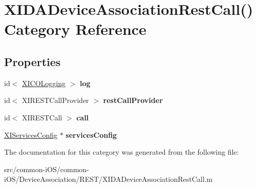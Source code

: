 \hypertarget{category_x_i_d_a_device_association_rest_call_07_08}{}\section{X\+I\+D\+A\+Device\+Association\+Rest\+Call() Category Reference}
\label{category_x_i_d_a_device_association_rest_call_07_08}
\subsection*{Properties}
\begin{DoxyCompactItemize}
\item 
\hypertarget{category_x_i_d_a_device_association_rest_call_07_08_ac4e9df19181651fd226fd84c9334ba4f}{}\label{category_x_i_d_a_device_association_rest_call_07_08_ac4e9df19181651fd226fd84c9334ba4f} 
id$<$ \hyperlink{protocol_x_i_c_o_logging-p}{X\+I\+C\+O\+Logging} $>$ {\bfseries log}
\item 
\hypertarget{category_x_i_d_a_device_association_rest_call_07_08_ac0bf2e56d3950418544f45ae9db883d7}{}\label{category_x_i_d_a_device_association_rest_call_07_08_ac0bf2e56d3950418544f45ae9db883d7} 
id$<$ X\+I\+R\+E\+S\+T\+Call\+Provider $>$ {\bfseries rest\+Call\+Provider}
\item 
\hypertarget{category_x_i_d_a_device_association_rest_call_07_08_a2baf9a9704716210f900964b45c57ca6}{}\label{category_x_i_d_a_device_association_rest_call_07_08_a2baf9a9704716210f900964b45c57ca6} 
id$<$ X\+I\+R\+E\+S\+T\+Call $>$ {\bfseries call}
\item 
\hypertarget{category_x_i_d_a_device_association_rest_call_07_08_ae1967b59fe578143d6f07e11e74cccda}{}\label{category_x_i_d_a_device_association_rest_call_07_08_ae1967b59fe578143d6f07e11e74cccda} 
\hyperlink{interface_x_i_services_config}{X\+I\+Services\+Config} $\ast$ {\bfseries services\+Config}
\end{DoxyCompactItemize}


The documentation for this category was generated from the following file\+:\begin{DoxyCompactItemize}
\item 
src/common-\/i\+O\+S/common-\/i\+O\+S/\+Device\+Association/\+R\+E\+S\+T/X\+I\+D\+A\+Device\+Association\+Rest\+Call.\+m\end{DoxyCompactItemize}
